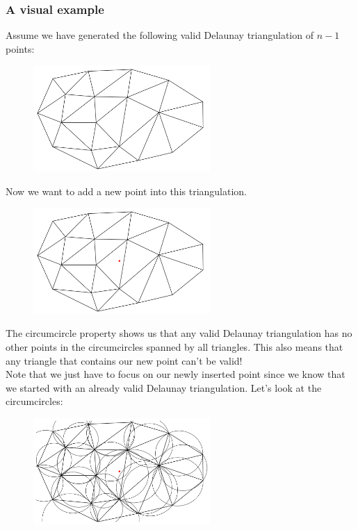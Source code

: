 \subsubsection{A visual example}
Assume we have generated the following valid Delaunay triangulation of $n-1$ points:
\begin{figure}[H]
    \centering
    \includegraphics[width=0.6\textwidth]{DelaunayVisualExample01.png}
\end{figure}
Now we want to add a new point into this triangulation.
\begin{figure}[H]
    \centering
    \includegraphics[width=0.6\textwidth]{DelaunayVisualExample02.png}
\end{figure}
The circumcircle property shows us that any valid Delaunay triangulation has no other points in the circumcircles spanned by all triangles. This also means that any triangle that contains our new point can't be valid!\\
Note that we just have to focus on our newly inserted point since we know that we started with an already valid Delaunay triangulation.
\newpage
Let's look at the circumcircles:
\begin{figure}[H]
    \centering
    \includegraphics[width=0.6\textwidth]{DelaunayVisualExample03.png}
\end{figure}
